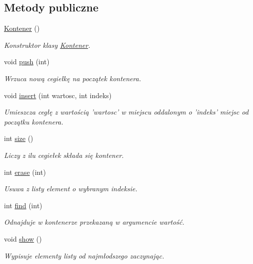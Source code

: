 \subsection*{Metody publiczne}
\begin{DoxyCompactItemize}
\item 
\hyperlink{class_kontener_acfd438daac27e2bce49e3996906fce04}{Kontener} ()
\begin{DoxyCompactList}\small\item\em Konstruktor klasy \hyperlink{class_kontener}{Kontener}. \end{DoxyCompactList}\item 
void \hyperlink{class_kontener_a3809188c7de418862808c5b660df7ff0}{push} (int)
\begin{DoxyCompactList}\small\item\em Wrzuca nową cegiełkę na początek kontenera. \end{DoxyCompactList}\item 
void \hyperlink{class_kontener_a04b49ab497d6a3b0abca2d19089a7981}{insert} (int wartosc, int indeks)
\begin{DoxyCompactList}\small\item\em Umieszcza cegłę z wartością 'wartosc' w miejscu oddalonym o 'indeks' miejsc od początku kontenera. \end{DoxyCompactList}\item 
int \hyperlink{class_kontener_aa1874bdb5728ba2d4d23137733430249}{size} ()
\begin{DoxyCompactList}\small\item\em Liczy z ilu cegiełek składa się kontener. \end{DoxyCompactList}\item 
int \hyperlink{class_kontener_a20830cba10e97685c4dc13253a3cc2ff}{erase} (int)
\begin{DoxyCompactList}\small\item\em Usuwa z listy element o wybranym indeksie. \end{DoxyCompactList}\item 
int \hyperlink{class_kontener_a5b0fd99db2e568ff69fd46131b1bd236}{find} (int)
\begin{DoxyCompactList}\small\item\em Odnajduje w kontenerze przekazaną w argumencie wartość. \end{DoxyCompactList}\item 
void \hyperlink{class_kontener_a1c6af960f6471b9b69a0ec7ebcdc2863}{show} ()
\begin{DoxyCompactList}\small\item\em Wypisuje elementy listy od najmłodszego zaczynając. \end{DoxyCompactList}\end{DoxyCompactItemize}
